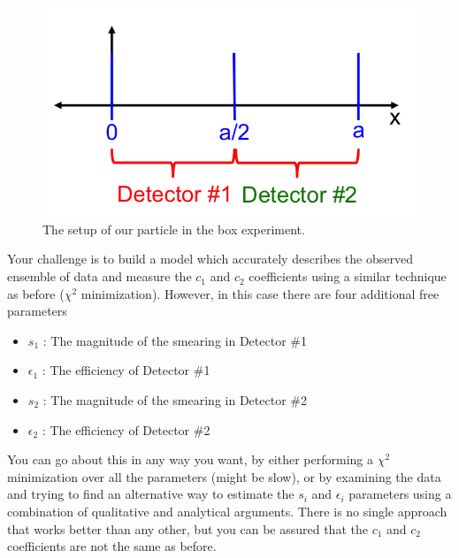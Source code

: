 \documentclass[12pt]{article}
\begin{document}
\begin{figure}[h!]
  \center
  \includegraphics[width=0.4\linewidth]{setup.png}
  \caption{The setup of our particle in the box experiment.}
  \label{fig:riemann}
\end{figure}
\newline
\newline
Your challenge is to build a model which accurately describes the observed ensemble of data and measure the $c_1$ and $c_2$ coefficients using a similar technique as before ($\chi^2$ minimization).  However, in this case there are four additional free parameters
\begin{itemize}[noitemsep]
\item $s_{1}$ : The magnitude of the smearing in Detector \#1
\item $\epsilon_1$ : The efficiency of Detector \#1
\item $s_{2}$ : The magnitude of the smearing in Detector \#2
\item $\epsilon_2$ : The efficiency of Detector \#2
\end{itemize}
You can go about this in any way you want, by either performing a $\chi^2$ minimization over all the parameters (might be slow), or by examining the data and trying to find an alternative way to estimate the $s_i$ and $\epsilon_i$ parameters using a combination of qualitative and analytical arguments.  There is no single approach that works better than any other, but you can be assured that the $c_1$ and $c_2$ coefficients are not the same as before.
\end{document}

